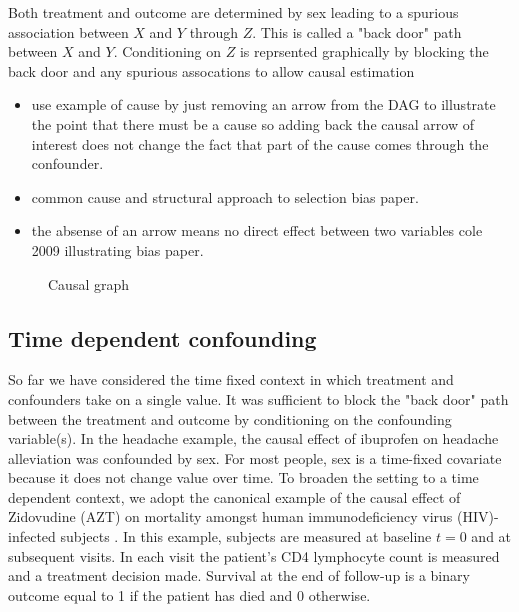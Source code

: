 \documentclass[11pt]{article}
\providecommand{\tightlist}{%
      \setlength{\itemsep}{0pt}\setlength{\parskip}{0pt}}
\begin{document}
Both treatment and outcome are determined by sex leading to a spurious
association between \(X\) and \(Y\) through \(Z\). This is called a
"back door" path between \(X\) and \(Y\). Conditioning on \(Z\) is
reprsented graphically by blocking the back door and any spurious
assocations to allow causal estimation

\begin{itemize}
\tightlist
\item
  use example of cause by just removing an arrow from the DAG to
  illustrate the point that there must be a cause so adding back the
  causal arrow of interest does not change the fact that part of the
  cause comes through the confounder.
\item
  common cause and structural approach to selection bias paper.
\item
  the absense of an arrow means no direct effect between two variables
  cole 2009 illustrating bias paper.
\end{itemize}

    \begin{figure}
\caption{Causal graph}
\end{figure}

    \subsection{Time dependent
confounding}\label{time-dependent-confounding}

So far we have considered the time fixed context in which treatment and
confounders take on a single value. It was sufficient to block the "back
door" path between the treatment and outcome by conditioning on the
confounding variable(s). In the headache example, the causal effect of
ibuprofen on headache alleviation was confounded by sex. For most
people, sex is a time-fixed covariate because it does not change value
over time. To broaden the setting to a time dependent context, we adopt
the canonical example of the causal effect of Zidovudine (AZT) on
mortality amongst human immunodeficiency virus (HIV)-infected subjects
\citet{Hernan2000}. In this example, subjects are measured at baseline
\(t = 0\) and at subsequent visits. In each visit the patient's CD4
lymphocyte count is measured and a treatment decision made. Survival at
the end of follow-up is a binary outcome equal to 1 if the patient has
died and 0 otherwise. \linebreak
\end{document}
